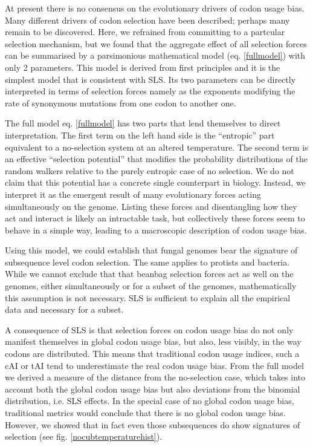 \documentclass[a4paper,10pt]{paper}%
\begin{document}
At present there is no consensus on  the evolutionary drivers of  codon usage bias. Many  different  drivers of codon selection have been described; perhaps many remain to be discovered.  Here, we refrained from committing to a partcular selection mechanism, but we found that  the aggregate effect of all selection forces can be summarised by a parsimonious mathematical model (eq. \ref{fullmodel}) with only  2 parameters. This model is derived from first principles and  it is  the  simplest  model  that is consistent with SLS.  Its two parameters can be  directly interpreted in terms of selection forces namely as the  exponents modifying the rate of synonymous mutations from one codon to another one. 
\par
The full model eq. \ref{fullmodel} has two parts that lend themselves to direct interpretation. The first term on the left hand side is the ``entropic'' part  equivalent to a no-selection system at an altered temperature. The second term is an effective ``selection potential'' that modifies the probability distributions of the random walkers relative to the purely entropic case of no selection. We do not claim  that this potential  has a concrete single counterpart  in biology. Instead,  we interpret it as the emergent result of many evolutionary forces  acting simultaneously on the genome. Listing these forces and disentangling how they act and interact is likely an  intractable task, but collectively these forces seem to behave in a simple way, leading to a macroscopic description of codon usage bias.   
\par
Using this model, we could establish that  fungal genomes  bear the signature of subsequence level codon selection.  The same applies to protists and bacteria.  While we cannot exclude that that beanbag selection forces act as well on the genomes, either simultaneously or for a subset of the genomes, mathematically this assumption is not necessary. SLS is sufficient to explain all the empirical data and necessary for a subset.  
\par
A consequence of SLS is that selection forces on codon usage bias do not only manifest themselves in global codon usage bias, but  also, less visibly, in the way codons are distributed. This means that traditional codon usage indices, such a cAI or tAI tend to underestimate the real codon usage bias. From the full model we derived a measure of the distance from the no-selection case, which takes into account both the global codon usage bias but also deviations from the binomial distribution, i.e. SLS effects. In the special case of no global codon usage bias, traditional metrics would conclude that there is no global codon usage bias. However, we showed that  in fact even those subsequences do show signatures of selection (see fig. \ref{nocubtemperaturehist}). 
\end{document}
